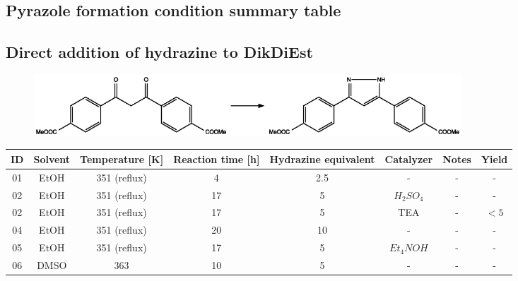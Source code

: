 \documentclass[../Master.tex]{subfiles}
\begin{document}
\begin{landscape}
	\appendix
	\begingroup
	\renewcommand{\arraystretch}{1} %
	\chapter{Pyrazole formation condition summary table}
	\section{Direct addition of hydrazine to DikDiEst}
	\begin{figure}[h!]
		\centering
		\includegraphics[width=16cm,keepaspectratio]{Structures/pyrazole-formation-appendix.eps}
	\end{figure}
	\begin{table}[h]
		\centering
		\setlength{\tabcolsep}{5pt}     %
		\begin{tabular}{cccccccc}
			\toprule
			\bf ID & \bf Solvent & \bf Temperature [K] & \bf Reaction time [h] & \bf Hydrazine equivalent & \bf Catalyzer   & \bf Notes & \bf Yield      \\
			\midrule
			01     & EtOH        & 351 (reflux)        & 4                     & 2.5                      & -               & -         & -              \\
			02     & EtOH        & 351 (reflux)        & 17                    & 5                        & \(H_{2}SO_{4}\) & -         & -              \\
			02     & EtOH        & 351 (reflux)        & 17                    & 5                        & TEA             & -         & \(< 5\)        \\
			04     & EtOH        & 351 (reflux)        & 20                    & 10                       & -               & -         & -              \\
			05     & EtOH        & 351 (reflux)        & 17                    & 5                        & \(Et_{4}NOH\)   & -         & -              \\
			06     & DMSO        & 363                 & 10                    & 5                        & -               & -         & -              \\

\end{tabular}
\end{table}
\end{landscape}
\end{document}
